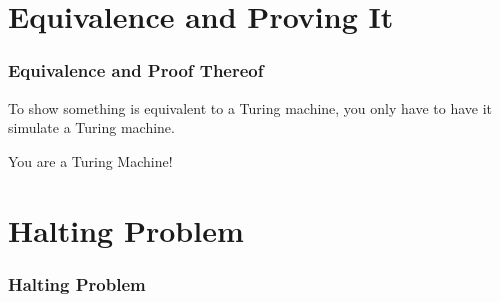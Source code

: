 \documentclass[mathserif]{beamer}
\begin{document}
    \section{Equivalence and Proving It}
    \begin{frame}
      \frametitle{Equivalence and Proof Thereof}

      \begin{center}
      To show something is equivalent to a Turing machine, you only have to
      have it simulate a Turing machine.

      \vspace{10mm}

      \Large You are a Turing Machine!
      \end{center}
    \end{frame}

    \section{Halting Problem}
    \begin{frame}
      \frametitle{Halting Problem}

    \end{frame}

  
\end{document}
